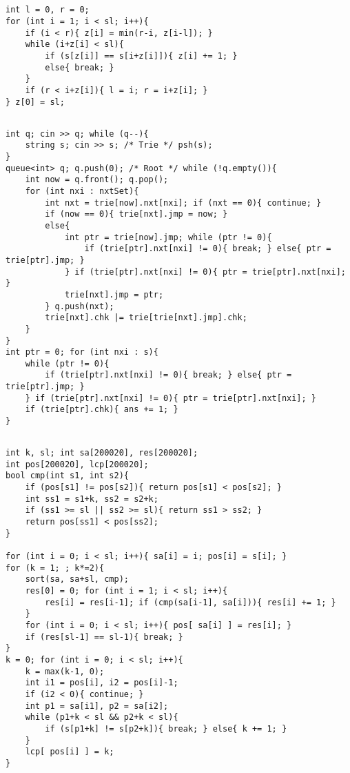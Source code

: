 \documentclass[landscape, 8pt, a4paper, oneside, twocolumn]{extarticle}
\begin{document}
\subsection{}
\begin{verbatim}
int l = 0, r = 0;
for (int i = 1; i < sl; i++){
    if (i < r){ z[i] = min(r-i, z[i-l]); }
    while (i+z[i] < sl){
        if (s[z[i]] == s[i+z[i]]){ z[i] += 1; }
        else{ break; }
    }
    if (r < i+z[i]){ l = i; r = i+z[i]; }
} z[0] = sl;
\end{verbatim}
\subsection{}
\begin{verbatim}
int q; cin >> q; while (q--){
    string s; cin >> s; /* Trie */ psh(s);
}
queue<int> q; q.push(0); /* Root */ while (!q.empty()){
    int now = q.front(); q.pop();
    for (int nxi : nxtSet){
        int nxt = trie[now].nxt[nxi]; if (nxt == 0){ continue; }
        if (now == 0){ trie[nxt].jmp = now; }
        else{
            int ptr = trie[now].jmp; while (ptr != 0){
                if (trie[ptr].nxt[nxi] != 0){ break; } else{ ptr = trie[ptr].jmp; }
            } if (trie[ptr].nxt[nxi] != 0){ ptr = trie[ptr].nxt[nxi]; }
            trie[nxt].jmp = ptr;
        } q.push(nxt);
        trie[nxt].chk |= trie[trie[nxt].jmp].chk;
    }
}
int ptr = 0; for (int nxi : s){
    while (ptr != 0){
        if (trie[ptr].nxt[nxi] != 0){ break; } else{ ptr = trie[ptr].jmp; }
    } if (trie[ptr].nxt[nxi] != 0){ ptr = trie[ptr].nxt[nxi]; }
    if (trie[ptr].chk){ ans += 1; }
}
\end{verbatim}
\subsection{}
\begin{verbatim}
int k, sl; int sa[200020], res[200020];
int pos[200020], lcp[200020];
bool cmp(int s1, int s2){
    if (pos[s1] != pos[s2]){ return pos[s1] < pos[s2]; }
    int ss1 = s1+k, ss2 = s2+k;
    if (ss1 >= sl || ss2 >= sl){ return ss1 > ss2; }
    return pos[ss1] < pos[ss2];
}

for (int i = 0; i < sl; i++){ sa[i] = i; pos[i] = s[i]; }
for (k = 1; ; k*=2){
    sort(sa, sa+sl, cmp);
    res[0] = 0; for (int i = 1; i < sl; i++){
        res[i] = res[i-1]; if (cmp(sa[i-1], sa[i])){ res[i] += 1; }
    }
    for (int i = 0; i < sl; i++){ pos[ sa[i] ] = res[i]; }
    if (res[sl-1] == sl-1){ break; }
}
k = 0; for (int i = 0; i < sl; i++){
    k = max(k-1, 0);
    int i1 = pos[i], i2 = pos[i]-1;
    if (i2 < 0){ continue; }
    int p1 = sa[i1], p2 = sa[i2];
    while (p1+k < sl && p2+k < sl){
        if (s[p1+k] != s[p2+k]){ break; } else{ k += 1; }
    }
    lcp[ pos[i] ] = k;
}
\end{verbatim}
\end{document}
